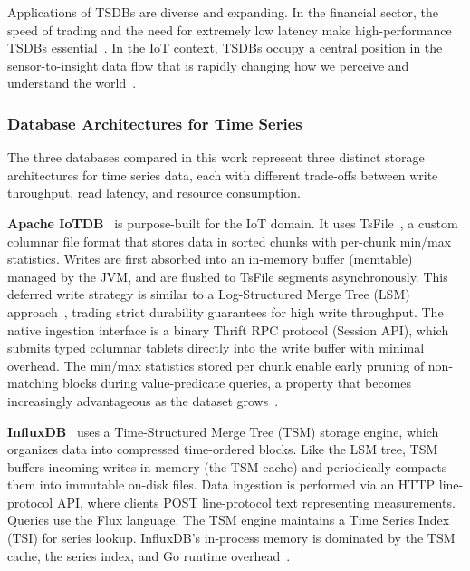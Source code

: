 Applications of TSDBs are diverse and expanding. In the financial sector, the speed of trading
and the need for extremely low latency make high-performance TSDBs essential~\citep{Dunning2014}.
In the IoT context, TSDBs occupy a central position in the sensor-to-insight data flow that is
rapidly changing how we perceive and understand the world~\citep{Dunning2014}.

\subsubsection{Database Architectures for Time Series}

The three databases compared in this work represent three distinct storage architectures for
time series data, each with different trade-offs between write throughput, read latency, and
resource consumption.

\textbf{Apache IoTDB}~\cite{wang2023iotdb} is purpose-built for the IoT domain. It uses TsFile~\citep{zhao2024tsfile},
a custom columnar file format that stores data in sorted chunks with per-chunk min/max statistics.
Writes are first absorbed into an in-memory buffer (memtable) managed by the JVM, and are
flushed to TsFile segments asynchronously. This deferred write strategy is similar to a
Log-Structured Merge Tree (LSM) approach~\citep{oneil1996lsm}, trading strict durability guarantees for high
write throughput. The native ingestion interface is a binary Thrift RPC protocol (Session API), which submits
typed columnar tablets directly into the write buffer with minimal overhead. The min/max statistics stored per chunk enable early pruning of non-matching blocks during value-predicate queries, a property that becomes increasingly
advantageous as the dataset grows~\citep{wang2023iotdb}.

\textbf{InfluxDB}~\cite{naqvi2017influxdb} uses a Time-Structured Merge Tree (TSM) storage
engine, which organizes data into compressed time-ordered blocks. Like the LSM tree, TSM
buffers incoming writes in memory (the TSM cache) and periodically compacts them into
immutable on-disk files. Data ingestion is performed via an HTTP line-protocol API, where
clients POST line-protocol text representing measurements. Queries use the Flux language.
The TSM engine maintains a Time Series Index (TSI) for series lookup. InfluxDB's in-process
memory is dominated by the TSM cache, the series index, and Go runtime overhead~\citep{naqvi2017influxdb}.

